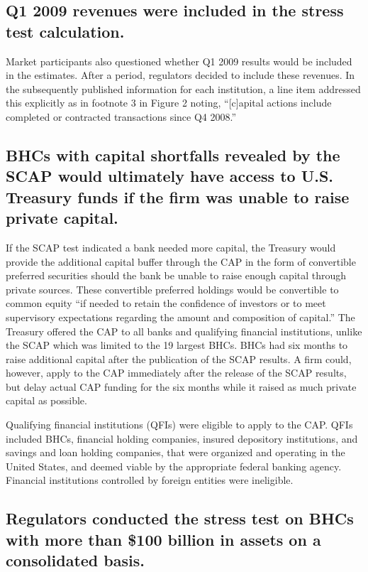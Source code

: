 \documentclass[12pt]{article}
\begin{document}
\subsection{Q1 2009 revenues were included in the stress test
calculation.}

Market participants also questioned whether Q1 2009 results would be
included in the estimates. After a period, regulators decided to include
these revenues. In the subsequently published information for each
institution, a line item addressed this explicitly as in footnote 3 in
Figure 2 noting, ``{[}c{]}apital actions include completed or contracted
transactions since Q4
2008.''

\subsection{BHCs with capital shortfalls revealed by the SCAP would
ultimately have access to U.S. Treasury funds if the firm was unable to
raise private
capital.}

If the SCAP test indicated a bank needed more capital, the Treasury
would provide the additional capital buffer through the CAP in the form
of convertible preferred securities should the bank be unable to raise
enough capital through private sources. These convertible preferred
holdings would be convertible to common equity ``if needed to retain the
confidence of investors or to meet supervisory expectations regarding
the amount and composition of capital.'' \citep{Term} The
Treasury offered the CAP to all banks and qualifying financial
institutions, unlike the SCAP which was limited to the
19 largest BHCs. BHCs had six months to raise additional capital after the publication of the SCAP
results. A firm could, however, apply to the CAP immediately after the release of the SCAP results, but delay actual CAP funding for the six months while it
raised as much private capital as possible.

Qualifying financial institutions (QFIs) were eligible to apply to the
CAP. QFIs included BHCs, financial holding companies, insured depository
institutions, and savings and loan holding companies, that were
organized and operating in the United States, and deemed viable by the
appropriate federal banking agency. Financial institutions controlled by
foreign entities were ineligible.\citep{Term}

\subsection{Regulators conducted the stress test on BHCs with more
than \$100 billion in assets on a consolidated
basis.}
\end{document}
